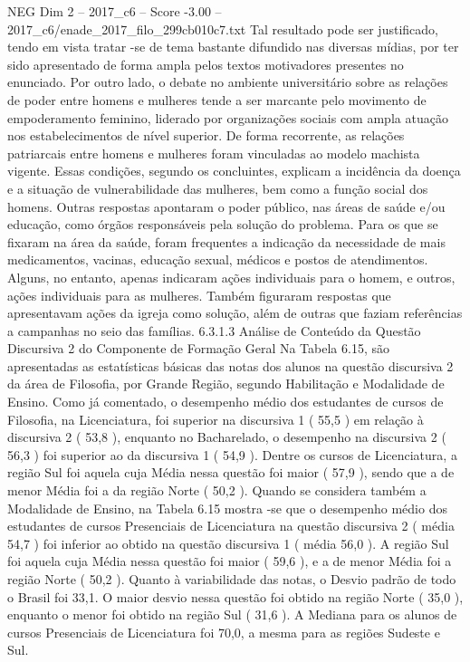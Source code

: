 \begin{textsample}{NEG Dim 2 – 2017\_c6 – Score -3.00 – 2017\_c6/enade\_2017\_filo\_299cb010c7.txt}
Tal resultado pode ser justificado, tendo em vista tratar -se de tema bastante difundido nas diversas mídias, por ter sido apresentado de forma ampla pelos textos motivadores presentes no enunciado.
Por outro lado, o debate no ambiente universitário sobre as relações de poder entre homens e mulheres tende a ser marcante pelo movimento de empoderamento feminino, liderado por organizações sociais com ampla atuação nos estabelecimentos de nível superior.
De forma recorrente, as relações patriarcais entre homens e mulheres foram vinculadas ao modelo machista vigente.
Essas condições, segundo os concluintes, explicam a incidência da doença e a situação de vulnerabilidade das mulheres, bem como a função social dos homens.
Outras respostas apontaram o poder público, nas áreas de saúde e/ou educação, como órgãos responsáveis pela solução do problema.
Para os que se fixaram na área da saúde, foram frequentes a indicação da necessidade de mais medicamentos, vacinas, educação sexual, médicos e postos de atendimentos.
Alguns, no entanto, apenas indicaram ações individuais para o homem, e outros, ações individuais para as mulheres.
Também figuraram respostas que apresentavam ações da igreja como solução, além de outras que faziam referências a campanhas no seio das famílias. 6.3.1.3 Análise de Conteúdo da Questão Discursiva 2 do Componente de Formação Geral Na Tabela 6.15, são apresentadas as estatísticas básicas das notas dos alunos na questão discursiva 2 da área de Filosofia, por Grande Região, segundo Habilitação e Modalidade de Ensino.
Como já comentado, o desempenho médio dos estudantes de cursos de Filosofia, na Licenciatura, foi superior na discursiva 1 ( 55,5 ) em relação à discursiva 2 ( 53,8 ), enquanto no Bacharelado, o desempenho na discursiva 2 ( 56,3 ) foi superior ao da discursiva 1 ( 54,9 ).
Dentre os cursos de Licenciatura, a região Sul foi aquela cuja Média nessa questão foi maior ( 57,9 ), sendo que a de menor Média foi a da região Norte ( 50,2 ).
Quando se considera também a Modalidade de Ensino, na Tabela 6.15 mostra -se que o desempenho médio dos estudantes de cursos Presenciais de Licenciatura na questão discursiva 2 ( média 54,7 ) foi inferior ao obtido na questão discursiva 1 ( média 56,0 ).
A região Sul foi aquela cuja Média nessa questão foi maior ( 59,6 ), e a de menor Média foi a região Norte ( 50,2 ).
Quanto à variabilidade das notas, o Desvio padrão de todo o Brasil foi 33,1.
O maior desvio nessa questão foi obtido na região Norte ( 35,0 ), enquanto o menor foi obtido na região Sul ( 31,6 ).
A Mediana para os alunos de cursos Presenciais de Licenciatura foi 70,0, a mesma para as regiões Sudeste e Sul.

\end{textsample}
